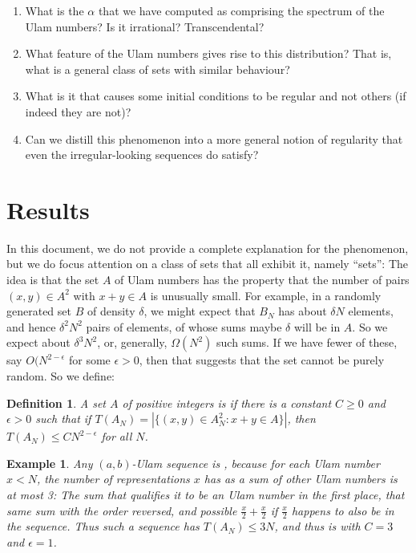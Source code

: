 \documentclass{report}
\newtheorem{definition}[theorem]{Definition}
\newtheorem{example}{Example}
\theoremstyle{remark}
\numberwithin{equation}{section}
\begin{document}
\begin{enumerate}
\item What is the $\alpha$ that we have computed as comprising the
  spectrum of the Ulam numbers?  Is it irrational?  Transcendental?

\item What feature of the Ulam numbers gives rise to this
  distribution?  That is, what is a general class of sets with similar
  behaviour?

\item What is it that causes some initial conditions to be regular and
  not others (if indeed they are not)?

\item Can we distill this phenomenon into a more general notion of
  regularity that even the irregular-looking sequences do satisfy?
\end{enumerate}

\section{Results}

In this document, we do not provide a complete explanation for the
phenomenon, but we do focus attention on a class of sets that all
exhibit it, namely ``\relevant sets'': The idea is that the set $A$ of
Ulam numbers has the property that the number of pairs
$(x, y) \in A^2$ with $x + y \in A$ is unusually small.  For example,
in a randomly generated set $B$ of density $\delta$, we might expect
that $B_N$ has about $\delta N$ elements, and hence $\delta^2 N^2$
pairs of elements, of whose sums maybe $\delta$ will be in $A$.  So we
expect about $\delta^3 N^2$, or, generally, $\Omega(N^2)$ such sums.
If we have fewer of these, say $O(N^{2-\epsilon}$ for some
$\epsilon > 0$, then that suggests that the set cannot be purely
random.  So we define: 

\begin{definition}A set $A$ of positive integers is
  \textbf{\relevant}if there is a constant $C \geq 0$ and $\epsilon > 0$
  such that if $T(A_N) = |\{(x, y)\in A_N^2 : x + y \in A\}|$, then
  $T(A_N) \leq C N^{2-\epsilon}$ for all $N$.  
\end{definition}

\begin{example}
  Any $(a,b)$-Ulam sequence is \relevant, because for each Ulam number
  $x < N$, the number of representations $x$ has as a sum of other
  Ulam numbers is at most 3: The sum that qualifies it to be an Ulam
  number in the first place, that same sum with the order reversed,
  and possible $\frac{x}{2} + \frac{x}{2}$ if $\frac{x}{2}$ happens to
  also be in the sequence.  Thus such a sequence has $T(A_N) \leq 3N$,
  and thus is \relevant with $C = 3$ and $\epsilon = 1$.
\end{example}
\end{document}
